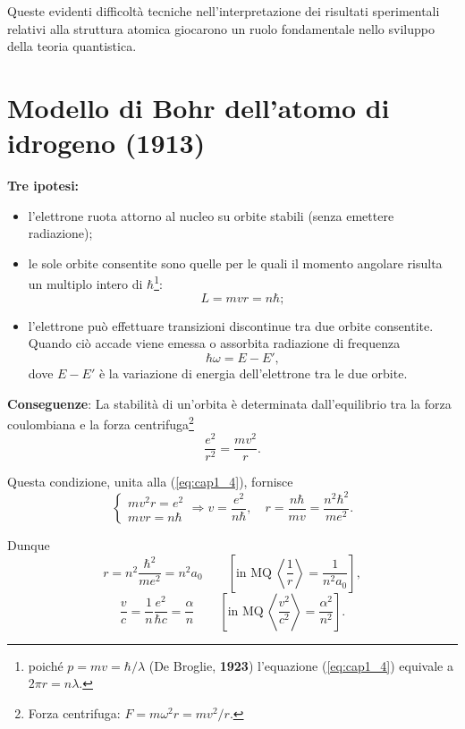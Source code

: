 Queste evidenti difficoltà tecniche nell'interpretazione dei risultati sperimentali relativi alla struttura atomica giocarono un ruolo fondamentale nello sviluppo della teoria quantistica.
\section{Modello di Bohr dell'atomo di idrogeno (1913)}
\textbf{Tre ipotesi:}
	\begin{itemize}
	\item l'elettrone ruota attorno al nucleo su orbite stabili (senza emettere radiazione);
	\item le sole orbite consentite sono quelle per le quali il momento angolare risulta un multiplo intero di $\hbar$\footnote{poiché $p= mv =\hbar/\lambda$ (De Broglie, \textbf{1923}) l'equazione (\ref{eq:cap1_4}) equivale a $2\pi r=n\lambda$.}:
		\begin{equation}
			L= mvr =n\hbar ;
		\label{eq:cap1_4}
		\end{equation}
	\item l'elettrone può effettuare transizioni discontinue tra due orbite consentite. Quando ciò accade viene emessa o assorbita radiazione di frequenza
	\begin{equation}
			\hbar \omega = E-E' ,
		\label{eq:cap1_5}
		\end{equation}
dove $E-E'$ è la variazione di energia dell'elettrone tra le due orbite.
	\end{itemize}
	
\textbf{Conseguenze}:
La stabilità di un'orbita è determinata dall'equilibrio tra la forza coulombiana e la forza centrifuga\footnote{Forza centrifuga: $F= m\omega ^2 r = mv^2 /r$.}
	\begin{equation}
	\frac{e^2}{r^2}=\frac{mv^2}{r} .
	\end{equation}
	
Questa condizione, unita alla (\ref{eq:cap1_4}), fornisce
	\begin{equation}
		\begin{cases}
		mv^2 r= e^2 \\
		mvr =n\hbar		
		\end{cases}
		\Rightarrow v=\frac{e^2}{n\hbar}, \quad r=\frac{n\hbar}{mv}=\frac{n^2 \hbar ^2}{me^2} .
	\end{equation}
	
Dunque
	\begin{equation}
	r=n^2 \frac{\hbar ^2}{me^2}= n^2 a_0 \qquad \left[\textrm{in MQ}\ \left\langle\frac{1}{r}\right\rangle = \frac{1}{n^2 a_0}\right],
	\end{equation}
		\begin{equation}
	\frac{v}{c}= \frac{1}{n}\frac{e^2}{\hbar c}=\frac{\alpha}{n} \qquad \left[\textrm{in MQ}\ \left\langle\frac{v^2}{c^2}\right\rangle = \frac{\alpha ^2}{n^2}\right].
	\end{equation}
	
